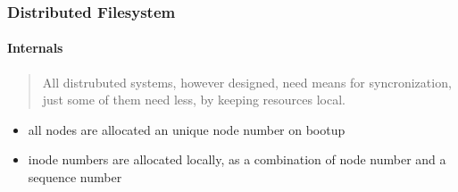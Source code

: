 \documentclass{ctexbeamer}
\begin{document}
\begin{frame}
\frametitle{Distributed Filesystem}
\framesubtitle{Internals}
\begin{verse}
  All distrubuted systems, however designed, need means for syncronization, just some of them need less, by keeping resources local.
\end{verse}
\begin{itemize}
  \item all nodes are allocated an unique node number on bootup
  \item inode numbers are allocated locally, as a combination of node number and a sequence number
\end{itemize}
\end{frame}
  
\end{document}
